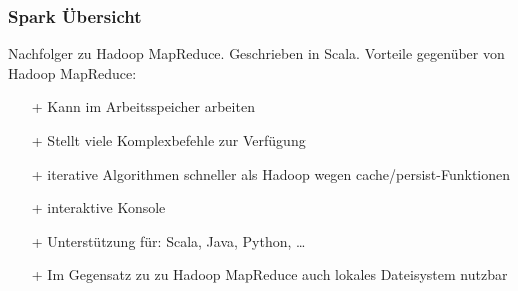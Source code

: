 \begin{frame}
    \frametitle{Spark Übersicht}
    Nachfolger zu Hadoop MapReduce. Geschrieben in Scala.
    Vorteile gegenüber von Hadoop MapReduce:
    \begin{itemize}
        \item[+] Kann im Arbeitsspeicher arbeiten %
        \item[+] Stellt viele Komplexbefehle zur Verfügung
        \item[+] iterative Algorithmen schneller als Hadoop wegen cache/persist-Funktionen
        \item[+] interaktive Konsole %
        \item[+] Unterstützung für: Scala, Java, Python, \ldots
        \item[+] Im Gegensatz zu zu Hadoop MapReduce auch lokales Dateisystem nutzbar %
    \end{itemize}
\end{frame}


